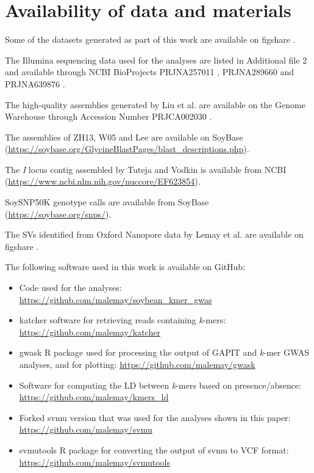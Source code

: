 \documentclass{article}
\begin{document}
\section*{Availability of data and materials}

Some of the datasets generated as part of this work are available on figshare
\citep{kmer-gwas-figshare}.

The Illumina sequencing data used for the analyses are listed in Additional file 2
and available through NCBI BioProjects PRJNA257011 \cite{PRJNA257011}, PRJNA289660 \cite{PRJNA289660}
and PRJNA639876 \cite{PRJNA639876}.

The high-quality assemblies generated by Liu et al. \cite{liu2020-pangenome} are available
on the Genome Warehouse through Accession Number PRJCA002030 \cite{PRJCA002030}.

The assemblies of ZH13, W05 and Lee are available on SoyBase
(\url{https://soybase.org/GlycineBlastPages/blast_descriptions.php}).

The \textit{I} locus contig assembled by Tuteja and Vodkin \cite{tuteja2008} is available from
NCBI (\url{https://www.ncbi.nlm.nih.gov/nuccore/EF623854}).

SoySNP50K genotype calls are available from SoyBase (\url{https://soybase.org/snps/}).

The SVs identified from Oxford Nanopore data by Lemay et al. \cite{lemay2022} are available
on figshare \citep{soybean-sv-figshare}.

The following software used in this work is available on GitHub:

\begin{itemize}
	\item Code used for the analyses:
		\url{https://github.com/malemay/soybean_kmer_gwas}
	\item katcher software for retrieving reads containing \textit{k}-mers:
		\url{https://github.com/malemay/katcher}
	\item gwask R package used for processing the output of GAPIT and
		\textit{k}-mer GWAS analyses, and for plotting:
		\url{https://github.com/malemay/gwask}
	\item Software for computing the LD between \textit{k}-mers
		based on presence/absence: \url{https://github.com/malemay/kmers_ld}
	\item Forked svmu version that was used for the analyses shown in this
		paper: \url{https://github.com/malemay/svmu}
	\item svmutools R package for converting the output of svmu to VCF
		format: \url{https://github.com/malemay/svmutools}
\end{itemize}
\end{document}
